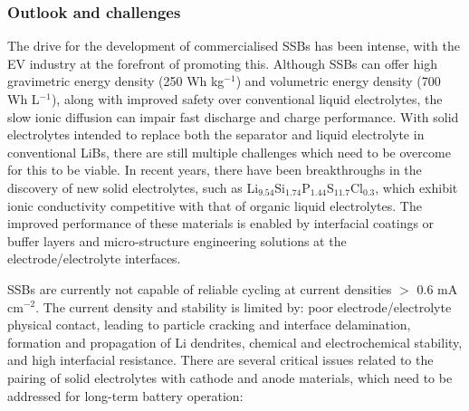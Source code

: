 \documentclass[../main.tex]{subfiles}
\begin{document}
\subsubsection{Outlook and challenges}
\label{sec:solids_outlook}
The drive for the development of commercialised SSBs has been intense, with the EV industry at the forefront of promoting this.\cite{Woods_2021} Although SSBs can offer high gravimetric energy density (250 Wh kg$^{-1}$) and volumetric energy density (700 Wh L$^{-1}$), along with improved safety over conventional liquid electrolytes, the slow ionic diffusion can impair fast discharge and charge performance. With solid electrolytes intended to replace both the separator and liquid electrolyte in conventional LiBs,\cite{schnell2020solid} there are still multiple challenges which need to be overcome for this to be viable. In recent years, there have been breakthroughs in the discovery of new solid electrolytes, such as Li$_{9.54}$Si$_{1.74}$P$_{1.44}$S$_{11.7}$Cl$_{0.3}$,\cite{kato2016high} which exhibit ionic conductivity competitive with that of organic liquid electrolytes. The improved performance of these materials is enabled by interfacial coatings or buffer layers and micro-structure engineering solutions at the electrode/electrolyte interfaces.\cite{kim2021solid}

SSBs are currently not capable of reliable cycling at current densities $>$ 0.6 mA cm$^{-2}$\cite{famprikis_fundamentals_2019, Albertus2018}. The current density and stability is limited by: poor electrode/electrolyte physical contact, leading to particle cracking and interface delamination, formation and propagation of Li dendrites, chemical and electrochemical stability, and high interfacial resistance.\cite{famprikis_fundamentals_2019} There are several critical issues related to the pairing of solid electrolytes with cathode and anode materials, which need to be addressed for long-term battery operation: 
\end{document}
